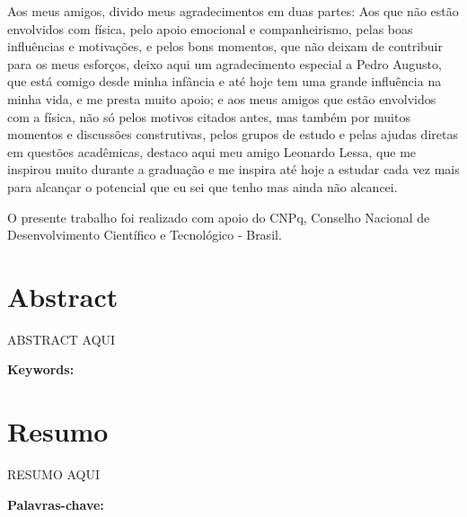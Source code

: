 \documentclass[openany,a4paper,12pt,oneside]{book}
\begin{document}
\begin{spacing}{1.5}
Aos meus amigos, divido meus agradecimentos em duas partes: Aos que não estão envolvidos com física, pelo apoio emocional e companheirismo, pelas boas influências e motivações, e pelos bons momentos, que não deixam de contribuir para os meus esforços, deixo aqui um agradecimento especial a Pedro Augusto, que está comigo desde minha infância e até hoje tem uma grande influência na minha vida, e me presta muito apoio; e aos meus amigos que estão envolvidos com a física, não só pelos motivos citados antes, mas também por muitos momentos e discussões construtivas, pelos grupos de estudo e pelas ajudas diretas em questões acadêmicas, destaco aqui meu amigo Leonardo Lessa, que me inspirou muito durante a graduação e me inspira até hoje a estudar cada vez mais para alcançar o potencial que eu sei que tenho mas ainda não alcancei.

O presente trabalho foi realizado com apoio do CNPq, Conselho Nacional de Desenvolvimento Científico e Tecnológico - Brasil.

\end{spacing}
\endgroup

\chapter*{Abstract}

ABSTRACT AQUI

\vspace{1cm}

\noindent \textbf{Keywords:}

\chapter*{Resumo}

RESUMO AQUI

\vspace{1cm}

\noindent \textbf{Palavras-chave:}


\listoffigures


\listoftables

\tableofcontents
\end{document}
